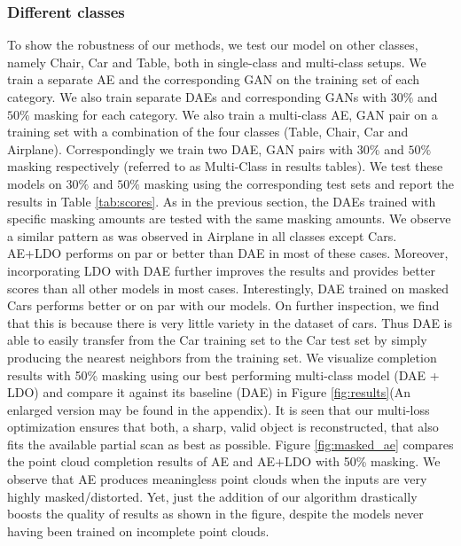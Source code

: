 \documentclass[10pt,twocolumn,letterpaper]{article}
\begin{document}
\subsubsection{Different classes}
To show the robustness of our methods, we test our model on other classes, namely Chair, Car and Table, both in single-class and multi-class setups. We train a separate AE and the corresponding GAN on the training set of each category. We also train separate DAEs and corresponding GANs with $30\%$ and $50\%$ masking for each category. We also train a multi-class AE, GAN pair on a training set with a combination of the four classes (Table, Chair, Car and Airplane). Correspondingly we train two DAE, GAN pairs with $30\%$ and $50\%$ masking respectively (referred to as Multi-Class in results tables). We test these models on $30\%$ and $50\%$ masking using the corresponding test sets and report the results in Table \ref{tab:scores}. As in the previous section, the DAEs trained with specific masking amounts are tested with the same masking amounts. We observe a similar pattern as was observed in Airplane in all classes except Cars. AE+LDO performs on par or better than DAE in most of these cases. Moreover, incorporating LDO with DAE further improves the results and provides better scores than all other models in most cases. Interestingly, DAE trained on masked Cars performs better or on par with our models. On further inspection, we find that this is because there is very little variety in the dataset of cars. Thus DAE is able to easily transfer from the Car training set to the Car test set by simply producing the nearest neighbors from the training set. 
We visualize completion results with 50\% masking using our best performing multi-class model (DAE + LDO) and compare it against its baseline (DAE) in Figure \ref{fig:results}(An enlarged version may be found in the appendix). It is seen that our multi-loss optimization ensures that both, a sharp, valid object is reconstructed, that also fits the available partial scan as best as possible. Figure \ref{fig:masked_ae} compares the point cloud completion results of AE and AE+LDO with 50\% masking. We observe that AE produces meaningless point clouds when the inputs are very highly masked/distorted. Yet, just the addition of our algorithm drastically boosts the quality of results as shown in the figure, despite the models never having been trained on incomplete point clouds.
\end{document}
